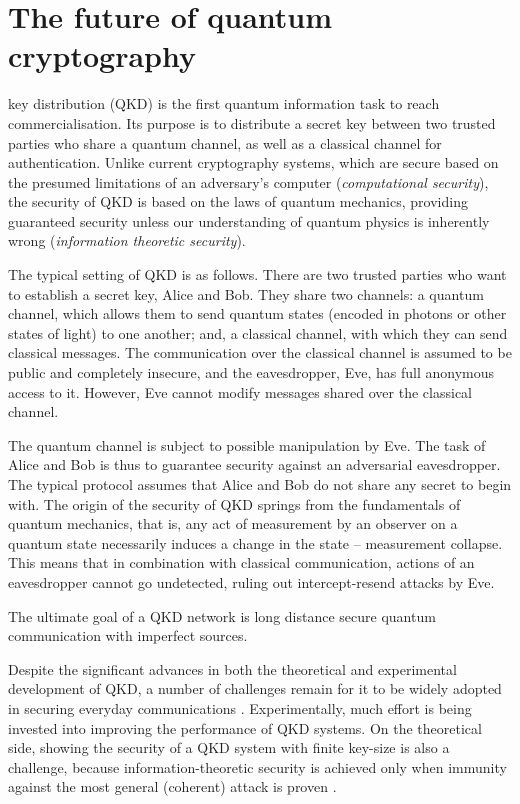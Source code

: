 \section{The future of quantum cryptography}\label{sec:essay_future_QKD}
 
 key distribution (QKD) is the first quantum information task to reach commercialisation. Its purpose is to distribute a secret key between two trusted parties who share a quantum channel, as well as a classical channel for authentication. Unlike current cryptography systems, which are secure based on the presumed limitations of an adversary's computer (\textit{computational security}), the security of QKD is based on the laws of quantum mechanics, providing guaranteed security unless our understanding of quantum physics is inherently wrong (\textit{information theoretic security}).

The typical setting of QKD is as follows. There are two trusted parties who want to establish a secret key, Alice and Bob. They share two channels: a quantum channel, which allows them to send quantum states (encoded in photons or other states of light) to one another; and, a classical channel, with which they can send classical messages. The communication over the classical channel is assumed to be public and completely insecure, and the eavesdropper, Eve, has full anonymous access to it. However, Eve cannot modify messages shared over the classical channel.

The quantum channel is subject to possible manipulation by Eve. The task of Alice and Bob is thus to guarantee security against an adversarial eavesdropper. The typical protocol assumes that Alice and Bob do not share any secret to begin with. The origin of the security of QKD springs from the fundamentals of quantum mechanics, that is, any act of measurement by an observer on a quantum state necessarily induces a change in the state -- measurement collapse. This means that in combination with classical communication, actions of an eavesdropper cannot go undetected, ruling out intercept-resend attacks by Eve.

The ultimate goal of a QKD network is long distance secure quantum communication with imperfect sources.

Despite the significant advances in both the theoretical and experimental development of QKD, a number of challenges remain for it to be widely adopted in securing everyday communications \cite{bib:RevModPhys.81.1301, bib:diamanti2016practical}. Experimentally, much effort is being invested into improving the performance of QKD systems. On the theoretical side, showing the security of a QKD system with finite key-size is also a challenge, because information-theoretic security is achieved only when immunity against the most general (coherent) attack is proven \cite{bib:diamanti2016practical}.


